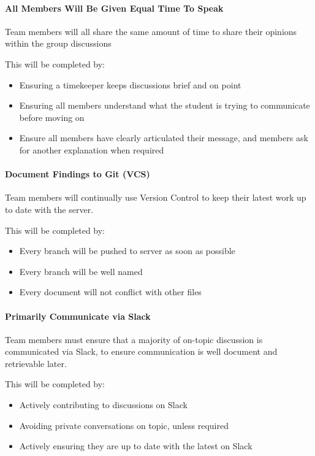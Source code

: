 \documentclass[12pt, a4paper, onecolumn]{article}
\begin{document}
\paragraph{All Members Will Be Given Equal Time To Speak}
Team members will all share the same amount of time to share their
opinions within the group discussions

This will be completed by:
\begin{itemize}
  \setlength\itemsep{1px}
  \item Ensuring a timekeeper keeps discussions brief and on point
  \item Ensuring all members understand what the student is trying
  to communicate before moving on
  \item Ensure all members have clearly articulated their message,
  and members ask for another explanation when required
\end{itemize}

\paragraph{Document Findings to Git (VCS)}
Team members will continually use Version Control to keep their latest
work up to date with the server.

This will be completed by:
\begin{itemize}
  \setlength\itemsep{1px}
  \item Every branch will be pushed to server as soon as possible
  \item Every branch will be well named
  \item Every document will not conflict with other files
\end{itemize}

\paragraph{Primarily Communicate via Slack}
Team members must ensure that a majority of on-topic discussion is
communicated via Slack, to ensure communication is well document
and retrievable later.

This will be completed by:
\begin{itemize}
  \setlength\itemsep{1px}
  \item Actively contributing to discussions on Slack
  \item Avoiding private conversations on topic, unless required
  \item Actively ensuring they are up to date with the latest on Slack
\end{itemize}
\end{document}
